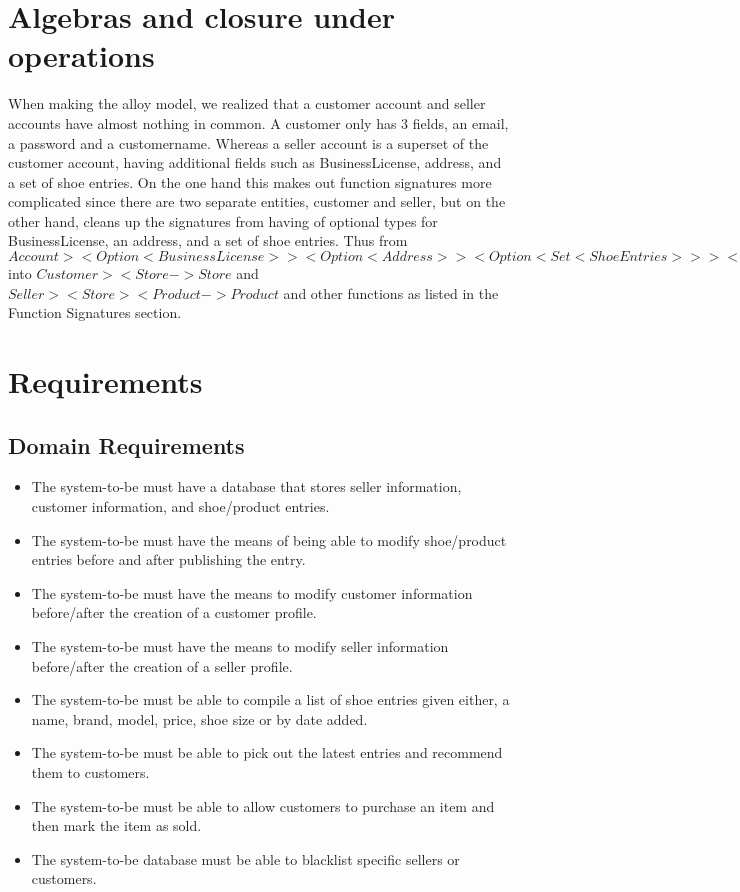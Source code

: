 \section{Algebras and closure under operations}
When making the alloy model, we realized that a customer account and seller accounts have almost nothing in common. A customer only has 3 fields, an email, a password and a customername. Whereas a seller account is a superset of the customer account, having additional fields such as BusinessLicense, address, and a set of shoe entries. On the one hand this makes out function signatures more complicated since there are two separate entities, customer and seller, but on the other hand, cleans up the signatures from having of optional types for BusinessLicense, an address, and a set of shoe entries. Thus from $Account >< Option<BusinessLicense>> < Option<Address> >< Option<Set<ShoeEntries>> >< Store -> Store$ into $Customer >< Store -> Store$ and $Seller >< Store >< Product -> Product$ and other functions as listed in the Function Signatures section.
\newpage
\section{Requirements}
\subsection{Domain Requirements}
\begin{itemize}
  \item The system-to-be must have a database that stores seller information, customer information, and shoe/product entries.
  \item The system-to-be must have the means of being able to modify shoe/product entries before and after publishing the entry.
  \item The system-to-be must have the means to modify customer information before/after the creation of a customer profile.
  \item The system-to-be must have the means to modify seller information before/after the creation of a seller profile.
  \item The system-to-be must be able to compile a list of shoe entries given either, a name, brand, model, price, shoe size or by date added.
  \item The system-to-be must be able to pick out the latest entries and recommend them to customers.
  \item The system-to-be must be able to allow customers to purchase an item and then mark the item as sold.
  \item The system-to-be database must be able to blacklist specific sellers or customers.
\end{itemize}
